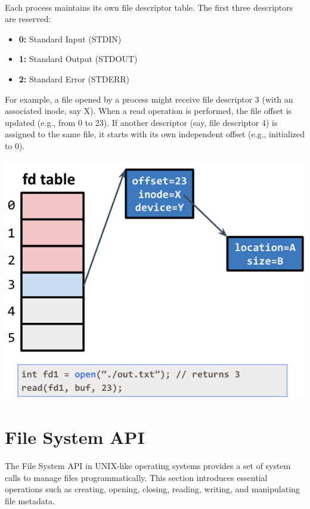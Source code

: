 \begin{example}
\leavevmode
\\[5px]
\noindent
\begin{minipage}{0.45\textwidth}
Each process maintains its own file descriptor table. The first three descriptors are reserved:
\begin{itemize}
  \item[] \textbf{0:} Standard Input (STDIN)
  \item[] \textbf{1:} Standard Output (STDOUT)
  \item[] \textbf{2:} Standard Error (STDERR)
\end{itemize}
For example, a file opened by a process might receive file descriptor 3 (with an associated inode, say X). When a read operation is performed, the file offset is updated (e.g., from 0 to 23). If another descriptor (say, file descriptor 4) is assigned to the same file, it starts with its own independent offset (e.g., initialized to 0).
\end{minipage}%
\hfill
\vline
\hfill
\begin{minipage}{0.45\textwidth}
\begin{center}
  \includegraphics[width=1\textwidth]{chapters/l6/images/ops.png}
\end{center}
\end{minipage}
\end{example}

\newpage

\section{File System API}
The File System API in UNIX-like operating systems provides a set of system calls to manage files programmatically. This section introduces essential operations such as creating, opening, closing, reading, writing, and manipulating file metadata.

